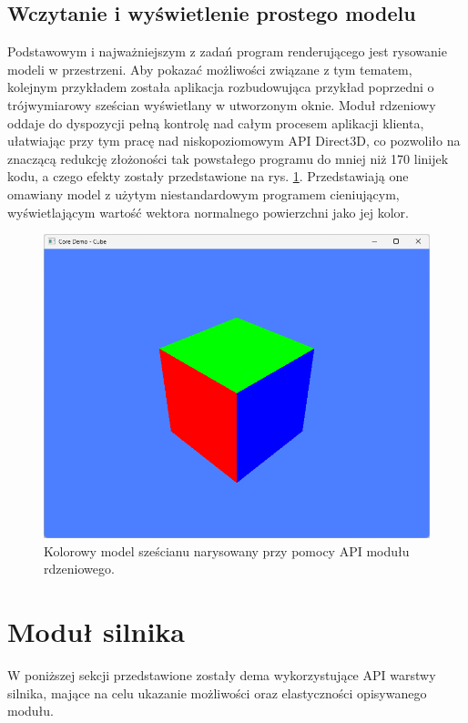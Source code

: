 \subsection{Wczytanie i wyświetlenie prostego modelu}
Podstawowym i najważniejszym z zadań program renderującego jest rysowanie modeli w przestrzeni. Aby pokazać możliwości związane z tym tematem, kolejnym przykładem została aplikacja rozbudowująca przykład poprzedni o trójwymiarowy sześcian wyświetlany w utworzonym oknie. Moduł rdzeniowy oddaje do dyspozycji pełną kontrolę nad całym procesem aplikacji klienta, ułatwiając przy tym pracę nad niskopoziomowym API Direct3D, co pozwoliło na znaczącą redukcję złożoności tak powstałego programu do mniej niż 170 linijek kodu, a czego efekty zostały przedstawione na rys. \ref{demo_core_cube}. Przedstawiają one omawiany model z użytym niestandardowym programem cieniującym, wyświetlającym wartość wektora normalnego powierzchni jako jej kolor. 

\begin{figure}[h!]
	\centering
	\includegraphics[width=\textwidth]{images/demo_core_cube.png}
	\caption{Kolorowy model sześcianu narysowany przy pomocy API modułu rdzeniowego.}
	\label{demo_core_cube}
\end{figure}

\section{Moduł silnika}
W poniższej sekcji przedstawione zostały dema wykorzystujące API warstwy silnika, mające na celu ukazanie możliwości oraz elastyczności opisywanego modułu.

